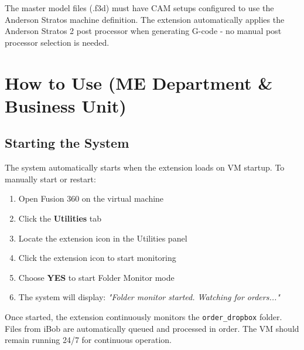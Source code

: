\documentclass[11pt,letterpaper]{article}
\begin{document}
\begin{tcolorbox}[colback=blue!5!white,colframe=blue!75!black,title=CAM Setup Requirement]
The master model files (.f3d) must have CAM setups configured to use the Anderson Stratos machine definition. The extension automatically applies the Anderson Stratos 2 post processor when generating G-code - no manual post processor selection is needed.
\end{tcolorbox}

\section{How to Use (ME Department \& Business Unit)}

\subsection{Starting the System}

The system automatically starts when the extension loads on VM startup. To manually start or restart:

\begin{enumerate}
    \item Open Fusion 360 on the virtual machine
    
    \item Click the \textbf{Utilities} tab
    
    \item Locate the extension icon in the Utilities panel
    
    \item Click the extension icon to start monitoring
    
    \item Choose \textbf{YES} to start Folder Monitor mode
    
    \item The system will display: \textit{"Folder monitor started. Watching for orders..."}
\end{enumerate}

\begin{tcolorbox}[colback=blue!5!white,colframe=blue!75!black,title=Automatic Operation]
Once started, the extension continuously monitors the \texttt{order\_dropbox} folder. Files from iBob are automatically queued and processed in order. The VM should remain running 24/7 for continuous operation.
\end{tcolorbox}
\end{document}
